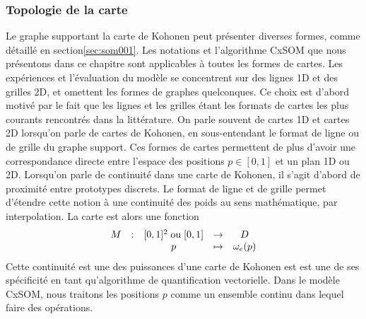 \subsubsection{Topologie de la carte}
Le graphe supportant la carte de Kohonen peut présenter diverses formes, comme détaillé en section\ref{sec:som001}. Les notations et l'algorithme CxSOM que nous présentons dans ce chapitre sont applicables à toutes les formes de cartes. Les expériences et l'évaluation du modèle se concentrent sur des lignes 1D et des grilles 2D, et omettent les formes de graphes quelconques. Ce choix est d'abord motivé par le fait que les lignes et les grilles étant les formats de cartes les plus courants rencontrés dans la littérature. On parle souvent de cartes 1D et cartes 2D lorsqu'on parle de cartes de Kohonen, en sous-entendant le format de ligne ou de grille du graphe support. Ces formes de cartes permettent de plus d'avoir une correspondance directe entre l'espace des positions $p \in [0,1]$ et un plan 1D ou 2D. Lorsqu'on parle de continuité dans une carte de Kohonen, il s'agit d'abord de proximité entre prototypes discrets. Le format de ligne et de grille permet d'étendre cette notion à une continuité des poids au sens mathématique, par interpolation. La carte est alors une fonction
\begin{equation*}
\begin{array}{ccccc}
M& : & [0,1]^2 \; \text{ou} \;[0,1] & \to & D \\
 & & p & \mapsto & \omega_e(p) \\
\end{array}
\end{equation*}
Cette continuité est une des puissances d'une carte de Kohonen est est une de ses spécificité en tant qu'algorithme de quantification vectorielle. Dans le modèle CxSOM, nous traitons les positions $p$ comme un ensemble continu dans lequel faire des opérations.

